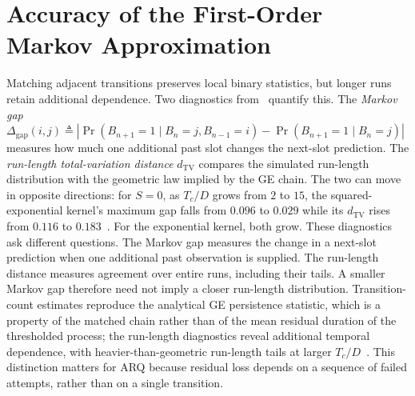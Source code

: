 \documentclass[conference]{IEEEtran}
\DeclareMathOperator{\Prob}{Pr}
\begin{document}
\section{Accuracy of the First-Order Markov Approximation}\label{sec:fidelity}
Matching adjacent transitions preserves local binary statistics, but longer runs retain additional dependence. Two diagnostics from~\cite[Sec.~5]{krishnamachari2026} quantify this. The \emph{Markov gap} $\Delta_{\mathrm{gap}}(i,j)\triangleq|\Prob(B_{n+1}{=}1\mid B_n{=}j,B_{n-1}{=}i)-\Prob(B_{n+1}{=}1\mid B_n{=}j)|$ measures how much one additional past slot changes the next-slot prediction. The \emph{run-length total-variation distance} $d_{\mathrm{TV}}$ compares the simulated run-length distribution with the geometric law implied by the GE chain. The two can move in opposite directions: for $S=0$, as $T_c/D$ grows from $2$ to $15$, the squared-exponential kernel's maximum gap falls from $0.096$ to $0.029$ while its $d_{\mathrm{TV}}$ rises from $0.116$ to $0.183$~\cite[Table~1]{krishnamachari2026}. For the exponential kernel, both grow. These diagnostics ask different questions. The Markov gap measures the change in a next-slot prediction when one additional past observation is supplied. The run-length distance measures agreement over entire runs, including their tails. A smaller Markov gap therefore need not imply a closer run-length distribution. Transition-count estimates reproduce the analytical GE persistence statistic, which is a property of the matched chain rather than of the mean residual duration of the thresholded process; the run-length diagnostics reveal additional temporal dependence, with heavier-than-geometric run-length tails at larger $T_c/D$~\cite[Sec.~7.2]{krishnamachari2026}. This distinction matters for ARQ because residual loss depends on a sequence of failed attempts, rather than on a single transition.
\end{document}
